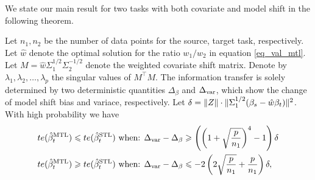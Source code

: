 


We state our main result for two tasks with both covariate and model shift in the following theorem.

\begin{theorem}\label{thm_model_shift}
	Let $n_1, n_2$ be the number of data points for the source, target task, respectively.
	Let $\hat{w}$ denote the optimal solution for the ratio $w_1/w_2$ in equation \eqref{eq_val_mtl}.
	Let ${M} = \hat{w} \Sigma_1^{1/2}\Sigma_2^{-1/2}$ denote the weighted covariate shift matrix.
	Denote by ${\lambda}_1, {\lambda}_2, \dots, {\lambda}_p$ the singular values of ${M}^{\top}{M}$.
	The information transfer is solely determined by two deterministic quantities $\Delta_{\beta}$ and $\Delta_{\text{var}}$, which show the change of model shift bias and variace, respectively.
	Let $\delta = \|Z\| \cdot \|\Sigma_1^{1/2}(\beta_s - \hat{w}\beta_t)\|^2$.
	With high probability we have
	\begin{align}
	 	te(\hat{\beta}_{t}^{\text{MTL}}) \leqslant te(\hat{\beta}_t^{\text{STL}}) \text{ when: } &\Delta_{\text{var}} - \Delta_{\beta} \geqslant \left(\left({1 + \sqrt{\frac{p} {n_1}}}\right)^4 - 1 \right) \delta \label{upper}\\
		te(\hat{\beta}_t^{\text{MTL}}) \geqslant te(\hat{\beta}_t^{\text{STL}}) \text{ when: } &\Delta_{\text{var}} - \Delta_{\beta} \leqslant -2\left({2\sqrt{\frac {p}{n_1}} + \frac{p}{n_1}}\right) \delta, \label{lower}
	\end{align}
\end{theorem}



